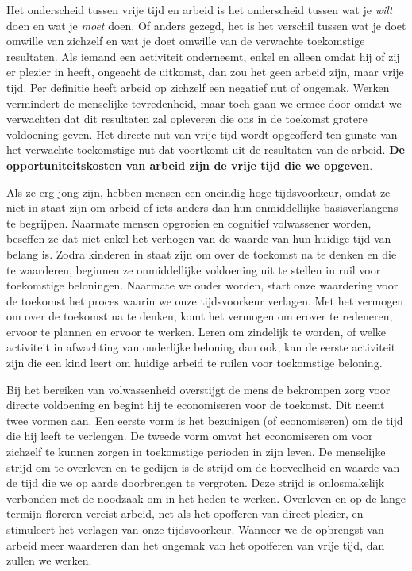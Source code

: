 Het onderscheid tussen vrije tijd en arbeid is het onderscheid tussen
wat je \emph{wilt} doen en wat je \emph{moet} doen. Of anders gezegd,
het is het verschil tussen wat je doet omwille van zichzelf en wat je
doet omwille van de verwachte toekomstige resultaten. Als iemand een
activiteit onderneemt, enkel en alleen omdat hij of zij er plezier in
heeft, ongeacht de uitkomst, dan zou het geen arbeid zijn, maar vrije
tijd. Per definitie heeft arbeid op zichzelf een negatief nut of
ongemak. Werken vermindert de menselijke tevredenheid, maar toch gaan we
ermee door omdat we verwachten dat dit resultaten zal opleveren die ons
in de toekomst grotere voldoening geven. Het directe nut van vrije tijd
wordt opgeofferd ten gunste van het verwachte toekomstige nut dat
voortkomt uit de resultaten van de arbeid. \textbf{De
opportuniteitskosten van arbeid zijn de vrije tijd die we opgeven}.

Als ze erg jong zijn, hebben mensen een oneindig hoge tijdsvoorkeur,
omdat ze niet in staat zijn om arbeid of iets anders dan hun
onmiddellijke basisverlangens te begrijpen. Naarmate mensen opgroeien en
cognitief volwassener worden, beseffen ze dat niet enkel het verhogen
van de waarde van hun huidige tijd van belang is. Zodra kinderen in
staat zijn om over de toekomst na te denken en die te waarderen,
beginnen ze onmiddellijke voldoening uit te stellen in ruil voor
toekomstige beloningen. Naarmate we ouder worden, start onze waardering
voor de toekomst het proces waarin we onze tijdsvoorkeur verlagen. Met
het vermogen om over de toekomst na te denken, komt het vermogen om
erover te redeneren, ervoor te plannen en ervoor te werken. Leren om
zindelijk te worden, of welke activiteit in afwachting van ouderlijke
beloning dan ook, kan de eerste activiteit zijn die een kind leert om
huidige arbeid te ruilen voor toekomstige beloning.

Bij het bereiken van volwassenheid overstijgt de mens de bekrompen zorg
voor directe voldoening en begint hij te economiseren voor de toekomst.
Dit neemt twee vormen aan. Een eerste vorm is het bezuinigen (of
economiseren) om de tijd die hij leeft te verlengen. De tweede vorm
omvat het economiseren om voor zichzelf te kunnen zorgen in toekomstige
perioden in zijn leven. De menselijke strijd om te overleven en te
gedijen is de strijd om de hoeveelheid en waarde van de tijd die we op
aarde doorbrengen te vergroten. Deze strijd is onlosmakelijk verbonden
met de noodzaak om in het heden te werken. Overleven en op de lange
termijn floreren vereist arbeid, net als het opofferen van direct plezier, en
stimuleert het verlagen van onze tijdsvoorkeur. Wanneer we de opbrengst
van arbeid meer waarderen dan het ongemak van het opofferen van vrije
tijd, dan zullen we werken.

